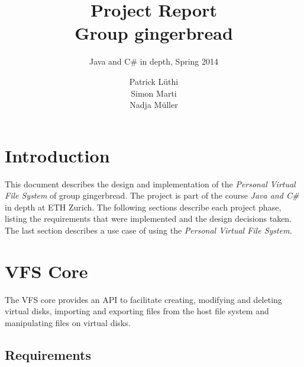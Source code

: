 \documentclass{scrartcl}
\title{Project Report\\
Group gingerbread}
\subtitle{Java and C\# in depth, Spring 2014}
\author{Patrick Lüthi\\
Simon Marti\\
Nadja Müller}
\begin{document}
\maketitle

\section{Introduction}
This document describes the design and implementation of the {\it Personal
Virtual File System} of group gingerbread. The project is part of the course
{\it Java and C\#} in depth at ETH Zurich. The following sections describe each
project phase, listing the requirements that were implemented and the design decisions taken.
The last section describes a use case of using the {\it Personal Virtual File
System.}

\section{VFS Core}
The VFS core provides an API to facilitate creating, modifying and deleting
virtual disks, importing and exporting files from the host file system and
manipulating files on virtual disks.

\subsection{Requirements}
\end{document}

